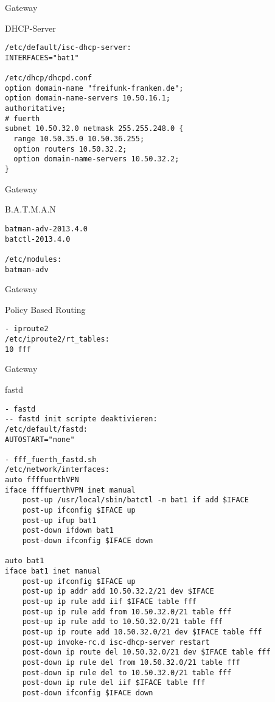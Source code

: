 \begin{frame}[fragile]{Gateway}
    \begin{block}{DHCP-Server}
        \begin{lstlisting}
/etc/default/isc-dhcp-server:
INTERFACES="bat1"

/etc/dhcp/dhcpd.conf
option domain-name "freifunk-franken.de";
option domain-name-servers 10.50.16.1;
authoritative;
# fuerth
subnet 10.50.32.0 netmask 255.255.248.0 {
  range 10.50.35.0 10.50.36.255;
  option routers 10.50.32.2;
  option domain-name-servers 10.50.32.2;
}
        \end{lstlisting}
    \end{block}
\end{frame}

\begin{frame}[fragile]{Gateway}
    \begin{block}{B.A.T.M.A.N}
        \begin{lstlisting}
batman-adv-2013.4.0
batctl-2013.4.0

/etc/modules:
batman-adv
        \end{lstlisting}
    \end{block}
\end{frame}

\begin{frame}[fragile]{Gateway}
    \begin{block}{Policy Based Routing}
        \begin{lstlisting}
- iproute2
/etc/iproute2/rt_tables:
10 fff
        \end{lstlisting}
    \end{block}
\end{frame}

\begin{frame}[fragile]{Gateway}
    \begin{block}{fastd}
        \begin{lstlisting}
- fastd
-- fastd init scripte deaktivieren:
/etc/default/fastd:
AUTOSTART="none"

- fff_fuerth_fastd.sh
/etc/network/interfaces:
auto ffffuerthVPN
iface ffffuerthVPN inet manual
    post-up /usr/local/sbin/batctl -m bat1 if add $IFACE
    post-up ifconfig $IFACE up
    post-up ifup bat1
    post-down ifdown bat1
    post-down ifconfig $IFACE down

auto bat1
iface bat1 inet manual
    post-up ifconfig $IFACE up
    post-up ip addr add 10.50.32.2/21 dev $IFACE
    post-up ip rule add iif $IFACE table fff
    post-up ip rule add from 10.50.32.0/21 table fff
    post-up ip rule add to 10.50.32.0/21 table fff
    post-up ip route add 10.50.32.0/21 dev $IFACE table fff
    post-up invoke-rc.d isc-dhcp-server restart
    post-down ip route del 10.50.32.0/21 dev $IFACE table fff
    post-down ip rule del from 10.50.32.0/21 table fff
    post-down ip rule del to 10.50.32.0/21 table fff
    post-down ip rule del iif $IFACE table fff
    post-down ifconfig $IFACE down
        \end{lstlisting}
    \end{block}
\end{frame}

